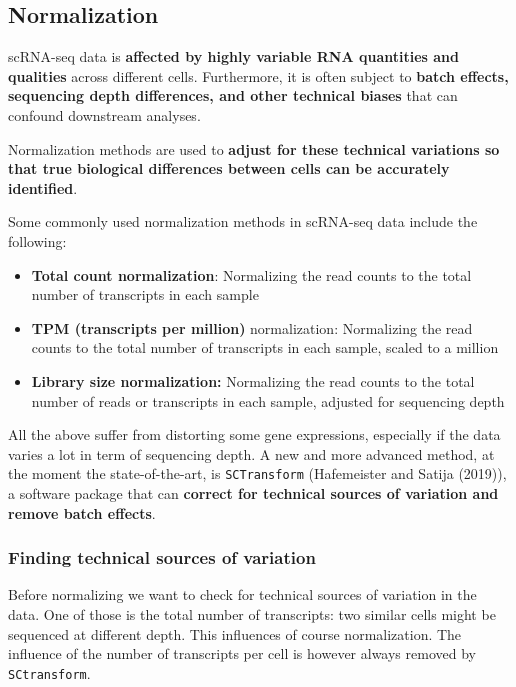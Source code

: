 \documentclass[
  letterpaper,
  DIV=11,
  numbers=noendperiod]{scrartcl}
\providecommand{\tightlist}{%
  \setlength{\itemsep}{0pt}\setlength{\parskip}{0pt}}\usepackage{longtable,booktabs,array}
\begin{document}
\hypertarget{normalization}{%
\subsection{Normalization}\label{normalization}}

scRNA-seq data is \textbf{affected by highly variable RNA quantities and
qualities} across different cells. Furthermore, it is often subject to
\textbf{batch effects, sequencing depth differences, and other technical
biases} that can confound downstream analyses.

Normalization methods are used to \textbf{adjust for these technical
variations so that true biological differences between cells can be
accurately identified}.

Some commonly used normalization methods in scRNA-seq data include the
following:

\begin{itemize}
\tightlist
\item
  \textbf{Total count normalization}: Normalizing the read counts to the
  total number of transcripts in each sample
\item
  \textbf{TPM (transcripts per million)} normalization: Normalizing the
  read counts to the total number of transcripts in each sample, scaled
  to a million
\item
  \textbf{Library size normalization:} Normalizing the read counts to
  the total number of reads or transcripts in each sample, adjusted for
  sequencing depth
\end{itemize}

All the above suffer from distorting some gene expressions, especially
if the data varies a lot in term of sequencing depth. A new and more
advanced method, at the moment the state-of-the-art, is
\texttt{SCTransform} (Hafemeister and Satija (2019)), a software package
that can \textbf{correct for technical sources of variation and remove
batch effects}.

\hypertarget{finding-technical-sources-of-variation}{%
\subsubsection{Finding technical sources of
variation}\label{finding-technical-sources-of-variation}}

Before normalizing we want to check for technical sources of variation
in the data. One of those is the total number of transcripts: two
similar cells might be sequenced at different depth. This influences of
course normalization. The influence of the number of transcripts per
cell is however always removed by \texttt{SCtransform}.
\end{document}
